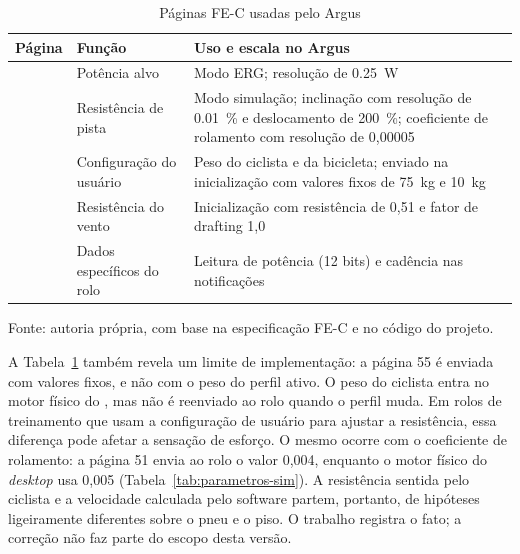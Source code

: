 \begin{table}[htbp]
    \centering
    \caption{Páginas FE-C usadas pelo Argus}
    \label{tab:fec-paginas}
    \small
    \begin{tabular}{@{}>{\raggedright\arraybackslash}p{1.4cm}
        >{\raggedright\arraybackslash}p{3.2cm}
        >{\raggedright\arraybackslash}p{8.6cm}@{}}
        \toprule
        \textbf{Página} & \textbf{Função} & \textbf{Uso e escala no Argus} \\
        \midrule
        49 & Potência alvo & Modo ERG; resolução de \SI{0.25}{\watt} \\
        51 & Resistência de pista & Modo simulação; inclinação com resolução
        de \SI{0.01}{\percent} e deslocamento de \SI{200}{\percent};
        coeficiente de rolamento com resolução de 0,00005 \\
        55 & Configuração do usuário & Peso do ciclista e da bicicleta;
        enviado na inicialização com valores fixos de \SI{75}{\kilogram} e
        \SI{10}{\kilogram} \\
        50 & Resistência do vento & Inicialização com resistência de 0,51 e
        fator de drafting 1,0 \\
        25 & Dados específicos do rolo & Leitura de potência (12 bits) e
        cadência nas notificações \\
        \bottomrule
    \end{tabular}
    \vspace{0.2cm}
    \par\small Fonte: autoria própria, com base na especificação FE-C
    \cite{antfec2024} e no código do projeto.
\end{table}

A Tabela~\ref{tab:fec-paginas} também revela um limite de implementação: a
página 55 é enviada com valores fixos, e não com o peso do perfil ativo. O peso
do ciclista entra no motor físico do \argus{}, mas não é reenviado ao rolo
quando o perfil muda. Em rolos de treinamento que usam a configuração de
usuário para ajustar a resistência, essa diferença pode afetar a sensação de
esforço. O mesmo ocorre com o coeficiente de rolamento: a página 51 envia ao
rolo o valor 0,004, enquanto o motor físico do \textit{desktop} usa 0,005
(Tabela~\ref{tab:parametros-sim}). A resistência sentida pelo ciclista e a
velocidade calculada pelo software partem, portanto, de hipóteses ligeiramente
diferentes sobre o pneu e o piso. O trabalho registra o fato; a correção não
faz parte do escopo desta versão.

